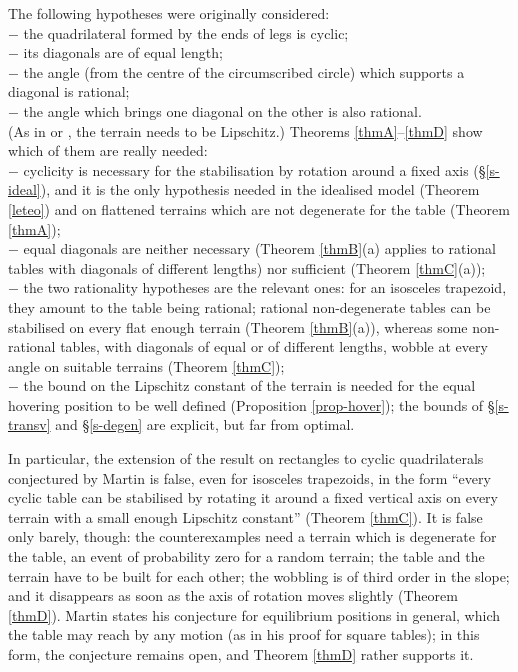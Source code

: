 \documentclass[a4paper,11pt,twoside,leqno]{article}
\numberwithin{equation}{section}
\begin{document}
The following hypotheses were originally considered:\\
$-$ \; the quadrilateral formed by the ends of legs is cyclic; \\
$-$ \; its diagonals are of equal length; \\
$-$ \; the angle (from the centre of the circumscribed circle) which supports a diagonal is rational; \\
$-$ \; the angle which brings one diagonal on the other is also rational.\\
(As in \cite{Mar} or \cite{BLPR}, the terrain needs to be Lipschitz.) Theorems \ref{thmA}--\ref{thmD} show which of them are really needed:\\
$-$ \; cyclicity is necessary for the stabilisation by rotation around a fixed axis (\S{}\ref{s-ideal}), and it is the only hypothesis needed in the idealised model (Theorem \ref{leteo}) and on flattened terrains which are not degenerate for the table (Theorem \ref{thmA});\\
$-$ \; equal diagonals are neither necessary (Theorem \ref{thmB}(a) applies to rational tables with diagonals of different lengths) nor sufficient (Theorem \ref{thmC}(a));\\
$-$ \; the two rationality hypotheses are the relevant ones: for an isosceles trapezoid, they amount to the table being rational; rational non-degenerate tables can be stabilised on every flat enough terrain (Theorem \ref{thmB}(a)), whereas some non-rational tables, with diagonals of equal or of different lengths, wobble at every angle on suitable terrains (Theorem \ref{thmC});\\
$-$ \; the bound on the Lipschitz constant of the terrain is needed for the equal hovering position to be well defined (Proposition \ref{prop-hover}); the bounds of \S{}\ref{s-transv} and \S{}\ref{s-degen} are explicit, but far from optimal.

In particular, the extension of the result on rectangles to cyclic quadrilaterals conjectured by Martin \cite[\S{}4]{Mar} is false, even for isosceles trapezoids, in the form ``every cyclic table can be stabilised by rotating it around a fixed vertical axis on every terrain with a small enough Lipschitz constant'' (Theorem \ref{thmC}). It is false only barely, though: the counterexamples need a terrain which is degenerate for the table, an event of probability zero for a random terrain; the table and the terrain have to be built for each other; the wobbling is of third order in the slope; and it disappears as soon as the axis of rotation moves slightly (Theorem \ref{thmD}). Martin states his conjecture for equilibrium positions in general, which the table may reach by any motion (as in his proof for square tables); in this form, the conjecture remains open, and Theorem \ref{thmD} rather supports it.
\end{document}
